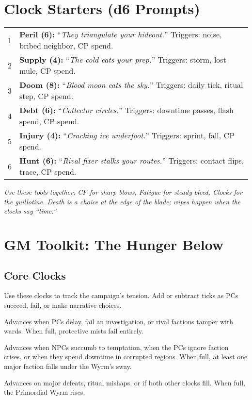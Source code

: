 \documentclass[12pt]{article}
\begin{document}
\section{Clock Starters (d6 Prompts)}
\begin{tabular}{@{}r p{11.5cm}@{}}
1 & \textbf{Peril (6):} ``\emph{They triangulate your hideout.}'' Triggers: noise, bribed neighbor, CP spend.\\
2 & \textbf{Supply (4):} ``\emph{The cold eats your prep.}'' Triggers: storm, lost mule, CP spend.\\
3 & \textbf{Doom (8):} ``\emph{Blood moon eats the sky.}'' Triggers: daily tick, ritual step, CP spend.\\
4 & \textbf{Debt (6):} ``\emph{Collector circles.}'' Triggers: downtime passes, flash spend, CP spend.\\
5 & \textbf{Injury (4):} ``\emph{Cracking ice underfoot.}'' Triggers: sprint, fall, CP spend.\\
6 & \textbf{Hunt (6):} ``\emph{Rival fixer stalks your routes.}'' Triggers: contact flips, trace, CP spend.\\
\end{tabular}

\bigskip
\noindent\emph{Use these tools together: CP for sharp blows, Fatigue for steady bleed, Clocks for the guillotine. Death is a choice at the edge of the blade; wipes happen when the clocks say ``time.''}

\section*{GM Toolkit: The Hunger Below}

\subsection*{Core Clocks}
Use these clocks to track the campaign’s tension. Add or subtract ticks as PCs succeed, fail, or make narrative choices.

\begin{description}[leftmargin=2cm]
  \item[Waystone Cracks (6-step):] Advances when PCs delay, fail an investigation, or rival factions tamper with wards. When full, protective mists fail entirely.
  \item[Whisper Spread (8-step):] Advances when NPCs succumb to temptation, when the PCs ignore faction crises, or when they spend downtime in corrupted regions. When full, at least one major faction falls under the Wyrm’s sway.
  \item[Chains Breaking (10-step):] Advances on major defeats, ritual mishaps, or if both other clocks fill. When full, the Primordial Wyrm rises.
\end{description}
\end{document}

